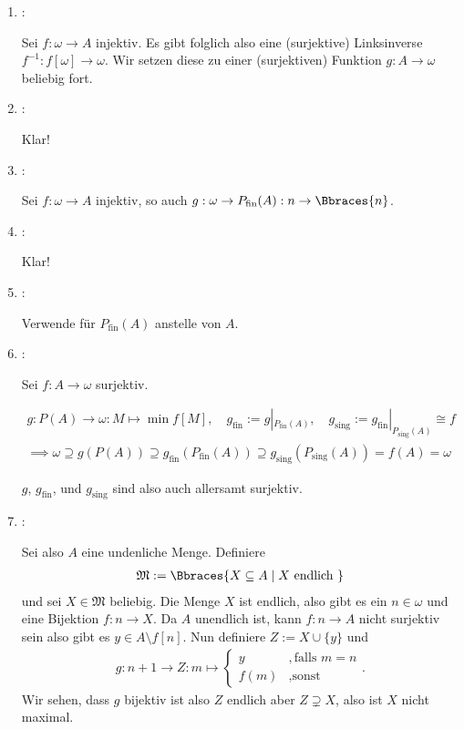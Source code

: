 \begin{solution}
\begin{enumerate}[label = \texttt{ad}]
  \item {}:
  
  Sei $f: \omega \to A$ injektiv.
  Es gibt folglich also eine (surjektive) Linksinverse $f^{-1}: f[\omega] \to \omega$.
  Wir setzen diese zu einer (surjektiven) Funktion $g: A \to \omega$ beliebig fort.

  \item {}:
  
  Klar!

  \item {}:

  Sei $f: \omega \to A$ injektiv, so auch $g: \omega \to P_\mathrm{fin}(A): n \to \Bbraces{n}$.

  \item {}:

  Klar!

  \item {}:

  Verwende  für $P_\mathrm{fin}(A)$ anstelle von $A$.

  \item {}:

  Sei $f: A \to \omega$ surjektiv.

  \begin{gather*}
    g:
    P(A) \to \omega:
    M \mapsto \min f[M],
    \quad
    g_\mathrm{fin} := g |_{P_\mathrm{fin}(A)},
    \quad
    g_\mathrm{sing} := g_\mathrm{fin} |_{P_\mathrm{sing}(A)} \cong f \\
    \implies
    \omega
    \supseteq
    g(P(A))
    \supseteq
    g_\mathrm{fin}(P_\mathrm{fin}(A))
    \supseteq
    g_\mathrm{sing}(P_\mathrm{sing}(A))
    =
    f(A)
    =
    \omega
  \end{gather*}

  $g$, $g_\mathrm{fin}$, und $g_\mathrm{sing}$ sind also auch allersamt surjektiv.
  
  \item {}:
  
  Sei also $A$ eine undenliche Menge. Definiere
  \begin{align*}
  	\mathfrak{M}:=\Bbraces{X \subseteq A \mid X \text{ endlich }}
  \end{align*}
  und sei $X \in \mathfrak{M}$ beliebig. Die Menge $X$ ist endlich, also gibt es ein $n \in \omega$ und eine Bijektion $f:n \to X$. Da $A$ unendlich ist, kann $f:n \to A$ nicht surjektiv sein also gibt es $y \in A \setminus f[n]$. Nun definiere $Z := X \cup \{y\}$ und
  \begin{align*}
  	g:n + 1 \to Z: m \mapsto
  	\begin{cases}
  		y & ,\text{falls } m = n \\
  		f(m) & ,\text{sonst }
  	\end{cases}.
  \end{align*}
  Wir sehen, dass $g$ bijektiv ist also $Z$ endlich aber $Z \supsetneq X$, also ist $X$ nicht maximal.
\end{enumerate}

\end{solution}

